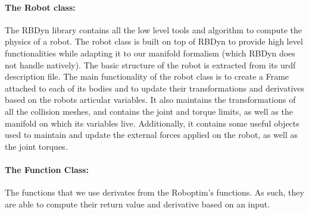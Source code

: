 \paragraph{The Robot class:}
The RBDyn library contains all the low level tools and algorithm to compute the physics of a robot.
The robot class is built on top of RBDyn to provide high level functionalities while adapting it to our manifold formalism (which RBDyn does not handle natively).
The basic structure of the robot is extracted from its urdf description file.
The main functionality of the robot class is to create a Frame attached to each of its bodies and to update their transformations and derivatives based on the robots articular variables.
It also maintains the transformations of all the collision meshes, and contains the joint and torque limits, as well as the manifold on which its variables live.
Additionally, it contains some useful objects used to maintain and update the external forces applied on the robot, as well as the joint torques.

\paragraph{The Function Class:}
The functions that we use derivates from the Roboptim's functions.
As such, they are able to compute their return value and derivative based on an input.

